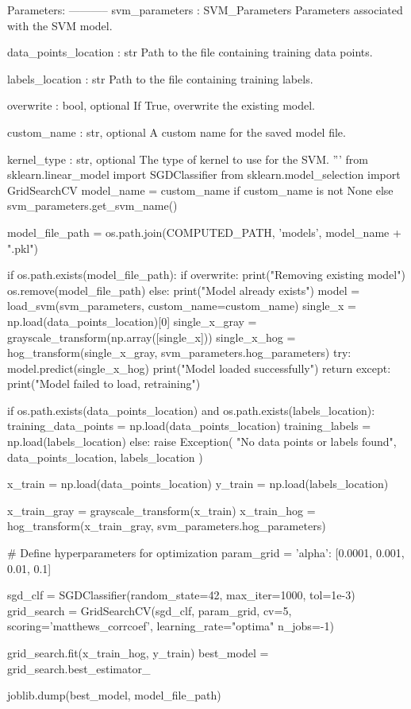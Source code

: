 \begin{pythoncode}
    Parameters:
    -----------
    svm_parameters : SVM_Parameters
        Parameters associated with the SVM model.
    
    data_points_location : str
        Path to the file containing training data points.
    
    labels_location : str
        Path to the file containing training labels.
    
    overwrite : bool, optional
        If True, overwrite the existing model.
    
    custom_name : str, optional
        A custom name for the saved model file.
    
    kernel_type : str, optional
        The type of kernel to use for the SVM.
    '''
    from sklearn.linear_model import SGDClassifier
    from sklearn.model_selection import GridSearchCV
    model_name = custom_name if custom_name is not None else svm_parameters.get_svm_name()

    model_file_path = os.path.join(COMPUTED_PATH, 'models', model_name + ".pkl")

    if os.path.exists(model_file_path):
      if overwrite:
        print("Removing existing model")
        os.remove(model_file_path)
      else:
        print("Model already exists")
        model = load_svm(svm_parameters, custom_name=custom_name)
        single_x = np.load(data_points_location)[0]
        single_x_gray = grayscale_transform(np.array([single_x]))
        single_x_hog = hog_transform(single_x_gray, svm_parameters.hog_parameters)
        try:
            model.predict(single_x_hog)
            print("Model loaded successfully")
            return
        except:
            print("Model failed to load, retraining")

    if os.path.exists(data_points_location) and os.path.exists(labels_location):
        training_data_points = np.load(data_points_location)
        training_labels = np.load(labels_location)
    else:
        raise Exception(
            "No data points or labels found",
            data_points_location,
            labels_location
        )

    x_train = np.load(data_points_location)
    y_train = np.load(labels_location)

    x_train_gray = grayscale_transform(x_train)
    x_train_hog = hog_transform(x_train_gray, svm_parameters.hog_parameters)
    
    # Define hyperparameters for optimization
    param_grid = {
        'alpha': [0.0001, 0.001, 0.01, 0.1]
    }

    sgd_clf = SGDClassifier(random_state=42, max_iter=1000, tol=1e-3)
    grid_search = GridSearchCV(sgd_clf, param_grid, cv=5, scoring='matthews_corrcoef', learning_rate="optima" n_jobs=-1)

    grid_search.fit(x_train_hog, y_train)
    best_model = grid_search.best_estimator_

    joblib.dump(best_model, model_file_path)

\end{pythoncode}

